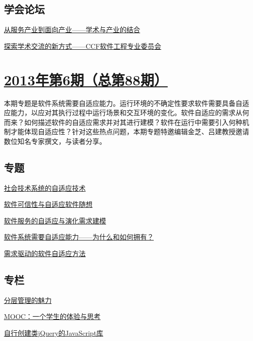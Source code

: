 \documentclass[a4paper]{article}
\begin{document}
\subsection{学会论坛}
\href{http://history.ccf.org.cn/resources/1190201776262/2013/07/19/16.pdf}{从服务产业到面向产业——学术与产业的结合}

\href{http://history.ccf.org.cn/resources/1190201776262/2013/07/19/17.pdf}{探索学术交流的新方式——CCF软件工程专业委员会}


\section{\href{http://history.ccf.org.cn/sites/ccf/jsjtbbd.jsp?contentId=2742828525686}{\textbf{2013年第6期（总第88期）}}}
本期专题是软件系统需要自适应能力。运行环境的不确定性要求软件需要具备自适应能力，以应对其执行过程中运行场景和交互环境的变化。软件自适应的需求从何而来？如何描述软件的自适应需求并对其进行建模？软件在运行中需要引入何种机制才能体现自适应性？针对这些热点问题，本期专题特邀编辑金芝、吕建教授邀请数位知名专家撰文，与读者分享。
\subsection{专题}
\href{http://history.ccf.org.cn/resources/1190201776262/2013/06/17/4.pdf}{社会技术系统的自适应技术}

\href{http://history.ccf.org.cn/resources/1190201776262/2013/06/17/2.pdf}{软件可信性与自适应软件随想}

\href{http://history.ccf.org.cn/resources/1190201776262/2013/06/17/3.pdf}{软件服务的自适应与演化需求建模}

\href{http://history.ccf.org.cn/resources/1190201776262/2013/06/17/1.pdf}{软件系统需要自适应能力——为什么和如何拥有？}

\href{http://history.ccf.org.cn/resources/1190201776262/2013/06/17/5.pdf}{需求驱动的软件自适应方法}

\subsection{专栏}
\href{http://history.ccf.org.cn/resources/1190201776262/2013/06/17/9.pdf}{分层管理的魅力}

\href{http://history.ccf.org.cn/resources/1190201776262/2013/06/17/7.pdf}{MOOC：一个学生的体验与思考}

\href{http://history.ccf.org.cn/resources/1190201776262/2013/06/17/8.pdf}{自行创建类jQuery的JavaScript库}
\end{document}
